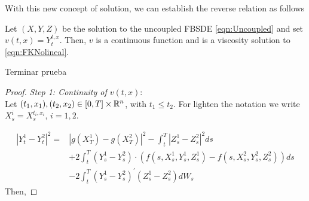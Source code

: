 With this new concept of solution, we can establish the reverse relation as follows
\begin{theorem}
	\label{thm:KFnonReps}
	 Let $(X,Y,Z)$ be the solution to the uncoupled FBSDE \eqref{eqn:Uncoupled} and set $v(t,x)=Y_{t}^{t,x}$. Then, $v$ is a continuous function and is a viscosity solution to \ref{eqn:FKNolineal}.
\end{theorem}
\begin{shaded*}
	\begin{center}
		{\Huge Terminar prueba}
	\end{center}
\end{shaded*}
\begin{proof}
	\textit{Step 1: Continuity of $v(t,x)$}: \\
	Let $(t_1,x_1),(t_2,x_2)\in [0,T]\times \mathbb{R}^n$, with $t_1\leq t_2$. For lighten the notation we write $X_{s}^i=X_s^{t_i,x_i}$, $i=1,2$.
	
	\begin{equation}
		\begin{aligned}
			\left|Y_t^1-Y_t^2\right|^2= & \left|g\left(X_T^1\right)-g\left(X_T^2\right)\right|^2-\int_t^T\left|Z_s^1-Z_s^2\right|^2 d s \\
			& +2 \int_t^T\left(Y_s^1-Y_s^2\right) \cdot\left(f\left(s, X_s^1, Y_s^1, Z_s^1\right)-f\left(s, X_s^2, Y_s^2, Z_s^2\right)\right) d s \\
			& -2 \int_t^T\left(Y_s^1-Y_s^2\right)^{\prime}\left(Z_s^1-Z_s^2\right) d W_s
		\end{aligned}
	\end{equation}
Then,


\end{proof}
